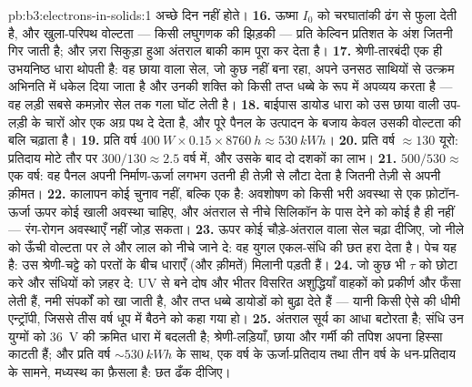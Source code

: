 \begin{solution}{pb:b3:electrons-in-solids:1}
अच्छे दिन नहीं होते।
\textbf{16.} ऊष्मा $I_0$ को चरघातांकी ढंग से फुला देती है, और
खुला-परिपथ वोल्टता --- किसी लघुगणक की झिड़की --- प्रति केल्विन
प्रतिशत के अंश जितनी गिर जाती है; और ज़रा सिकुड़ा हुआ अंतराल बाकी
काम पूरा कर देता है।
\textbf{17.} श्रेणी-तारबंदी एक ही उभयनिष्ठ धारा थोपती है: वह छाया
वाला सेल, जो कुछ नहीं बना रहा, अपने उनसठ साथियों से उत्क्रम अभिनति
में धकेल दिया जाता है और उनकी शक्ति को किसी तप्त धब्बे के रूप में
अपव्यय करता है --- वह लड़ी सबसे कमज़ोर सेल तक गला घोंट लेती है।
\textbf{18.} बाईपास डायोड धारा को उस छाया वाली उप-लड़ी के चारों ओर
एक अग्र पथ दे देता है, और पूरे पैनल के उत्पादन के बजाय केवल उसकी
वोल्टता की बलि चढ़ाता है।
\textbf{19.} प्रति वर्ष $\qty{400}{W}\times0.15\times\qty{8760}{h} \approx
\qty{530}{kWh}$।
\textbf{20.} प्रति वर्ष $\approx 130$ यूरो: प्रतिदाय मोटे
तौर पर $300/130 \approx 2.5$ वर्ष में, और उसके बाद दो दशकों का लाभ।
\textbf{21.} $500/530 \approx$ एक वर्ष: वह पैनल अपनी निर्माण-ऊर्जा
लगभग उतनी ही तेज़ी से लौटा देता है जितनी तेज़ी से अपनी क़ीमत।
\textbf{22.} कालापन कोई चुनाव नहीं, बल्कि एक  है:
अवशोषण को किसी भरी अवस्था से एक फ़ोटॉन-ऊर्जा ऊपर कोई खाली अवस्था
चाहिए, और अंतराल से नीचे सिलिकॉन के पास देने को कोई है ही नहीं ---
रंग-रोगन अवस्थाएँ नहीं जोड़ सकता।
\textbf{23.} ऊपर कोई चौड़े-अंतराल वाला सेल चढ़ा दीजिए, जो नीले को
ऊँची वोल्टता पर ले और लाल को नीचे जाने दे: वह युगल एकल-संधि की छत
हरा देता है। पेच यह है: उस श्रेणी-चट्टे को परतों के बीच धाराएँ (और
क़ीमतें) मिलानी पड़ती हैं।
\textbf{24.} जो कुछ भी $\tau$ को छोटा करे और संधियों को ज़हर दे:
UV से बने दोष और भीतर विसरित अशुद्धियाँ वाहकों को प्रकीर्ण और
फँसा लेती हैं, नमी संपर्कों को खा जाती है, और तप्त धब्बे डायोडों को
बुढ़ा देते हैं --- यानी किसी ऐसे  की धीमी एन्ट्रॉपी, जिससे
तीस वर्ष धूप में बैठने को कहा गया हो।
\textbf{25.} अंतराल सूर्य का आधा बटोरता है; संधि उन युग्मों को
\qty{36}{V} की क्रमित धारा में बदलती है; श्रेणी-लड़ियाँ,
छाया और गर्मी की तपिश अपना हिस्सा काटती हैं; और प्रति वर्ष
$\sim\qty{530}{kWh}$ के साथ, एक वर्ष के ऊर्जा-प्रतिदाय तथा
तीन वर्ष के धन-प्रतिदाय के सामने, मध्यस्थ का फ़ैसला है: छत ढँक दीजिए।
\end{solution}
